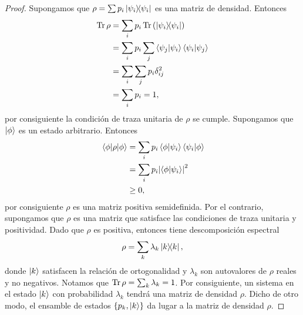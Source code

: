 \begin{proof}
	Supongamos que $\rho = \sum p_i\dyad{\psii}{\psii}$ es una matriz de
	densidad. Entonces 
	\begin{align*}
		\Tr \rho &= \sum _i p_i\Tr \qty(\dyad{\psii}{\psii})\\
		&= \sum _i p_i \sum _j \braket{\psi_j}{\psii}\braket{\psii}{\psi_j}\\
		&=\sum _i \sum _j p_i \delta _{ij}^2\\
		&=\sum _i p_i=1,
	\end{align*}
	por consiguiente la condición de traza unitaria de $\rho$ se cumple. 
	Supongamos que $\ket{\phi}$ es un estado arbitrario. Entonces
	\begin{align*}
		\matrixel{\phi}{\rho}{\phi} &= \sum _i p_i \braket{\phi}{\psii}
		\braket{\psii}{\phi} \\
		&=\sum _i p_i \abs{\braket{\phi}{\psii}}^2\\
		&\geq 0,
	\end{align*}
	por consiguiente $\rho$ es una matriz positiva semidefinida. Por el 
	contrario, supongamos que $\rho$ es una matriz que satisface las condiciones
	de traza unitaria y positividad. Dado que $\rho$ es positiva, entonces
	tiene descomposición espectral 
	\begin{align*}
		\rho = \sum _k \lambda _k \dyad{k}{k},
	\end{align*}
	donde $\ket{k}$ satisfacen la relación de ortogonalidad y $\lambda _k$ son
	autovalores de $\rho$ reales y no negativos. Notamos que $\Tr \rho = \sum _k
	\lambda _k = 1$. Por consiguiente, un sistema en el estado $\ket{k}$ con 
	probabilidad $\lambda_k$ tendrá una matriz de densidad $\rho$. Dicho 
	de otro modo, el ensamble de estados $\{ p_k,\ket{k}\}$ da lugar a la matriz
	de densidad $\rho$.
\end{proof}
